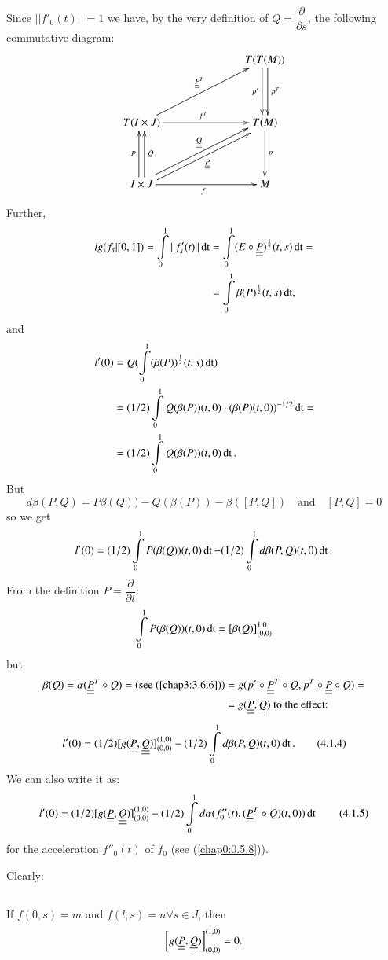 Since $||f'_{0}(t)||=1$ we have, by the very definition of
$Q=\dfrac{\partial}{\partial s}$, the following commutative diagram:
\[
\xymatrix@C=2.5cm@R=1.5cm{
 & T(T(M))\ar@<.25em>[d]^{p^{T}}\ar@<-.25em>[d]_{p'}\\
T(I\times J)\ar[r]^{f^{T}}\ar[ur]^{\uub{P}^{T}} & T(M)\ar[d]^{p}\\
I\times
J\ar@<.25em>[u]^{P}\ar@<-.25em>[u]_{Q}\ar@<.25em>[ur]^{\uub{Q}}\ar@<-.25em>[ur]_{\uub{P}}\ar[r]_{f}
& M
}
\]
Further,
\begin{align*}
lg(f_{s}|[0,1])=\int\limits^{1}_{0}||f'_{s}(t)||\operatorname{dt}&=
\int\limits^{1}_{0}(E\circ \underline{\underline{P}})^{\frac{1}{2}}(t,s)\operatorname{dt}=\\
&=\int\limits^{1}_{0}\beta(P)^{\frac{1}{2}}(t,s)\operatorname{dt},
\end{align*}
and
\begin{align*}
l'(0)&=Q(\int\limits^{1}_{0}(\beta(P))^{\frac{1}{2}}(t,s)\operatorname{dt})\\ 
&=(1/2)\int\limits^{1}_{0}Q(\beta(P))(t,0)\cdot(\beta(P)(t,0))^{-1/2}\operatorname{dt}=\\
&=(1/2)\int\limits^{1}_{0}Q(\beta(P))(t,0)\operatorname{dt}.
\end{align*}
But\pageoriginale
$$
d\beta(P,Q)=P\beta(Q))-Q(\beta(P))-\beta([P,Q])\quad\text{and}\quad [P,Q]=0
$$
so we get
$$
l'(0)=(1/2)\int\limits^{1}_{0}P(\beta(Q))(t,0)\operatorname{dt}-(1/2)\int\limits^{1}_{0}d\beta(P,Q)(t,0)\operatorname{dt}.
$$
From the definition $P=\dfrac{\partial}{\partial t}$:
$$
\int\limits^{1}_{0}P(\beta(Q))(t,0)\operatorname{dt}=[\beta(Q)]^{1,0}_{(0,0)}
$$
but
\begin{align*}
\beta(Q)=\alpha(\underline{\underline{P}}^{T}\circ Q)=(\text{see (\ref{chap3:3.6.6})}) &=
g(p'\circ\underline{\underline{P}}^{T}\circ Q,p^{T}\circ \underline{\underline{P}}\circ Q)=\\
&= g(\underline{\underline{P}},\underline{\underline{Q}})\text{ to the effect:}
\end{align*}
\begin{equation*}
l'(0)=(1/2)[g(\underline{\underline{P}},\underline{\underline{Q}})]^{(1,0)}_{(0,0)}-(1/2)\int\limits^{1}_{0}d\beta(P,Q)(t,0)\operatorname{dt}.\tag{4.1.4}\label{chap4:4.1.4} 
\end{equation*}
We can also write it as:
\begin{equation*}
l'(0)=(1/2)[g(\underline{\underline{P}},\underline{\underline{Q}})]^{(1,0)}_{(0,0)}-(1/2)\int\limits^{1}_{0}d\alpha(f''_{0}(t),(\underline{\underline{P}}^{T}\circ Q)(t,0))\operatorname{dt}\tag{4.1.5}\label{chap4:4.1.5}
\end{equation*}
for the acceleration $f''_{0}(t)$ of $f_{0}$ (see (\ref{chap0:0.5.8})).

Clearly:

\setcounter{section}{1}
\setcounter{subsection}{5}
\subsection{}\label{chap4:4.1.6}
If $f(0,s)=m$ and $f(l,s)=n\forall s\in J$, then
$$
\left[g(\underline{\underline{P}},\underline{\underline{Q}})\right]^{(1,0)}_{(0,0)}=0.
$$

